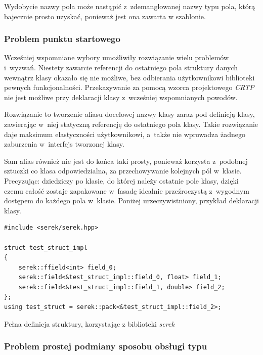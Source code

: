 \documentclass[12pt]{article}
\newcommand{\n}{\newline}
\newcommand{\nonpl}[1]{{\it #1}}
\newcommand{\CRTP}{\nonpl{CRTP} }
\newcommand{\serek}{\nonpl{serek}}
\begin{document}
{{{				Wydobycie nazwy pola może nastąpić z~zdemanglowanej nazwy typu pola, którą bajecznie prosto uzyskać, ponieważ jest ona zawarta
				w szablonie.
			}

			{
				\subsubsection{Problem punktu startowego}

				Wcześniej wspomniane wybory umożliwiły rozwiązanie wielu problemów i~wyzwań. Niestety zawarcie referencji do ostatniego pola
				struktury danych wewnątrz klasy okazało się nie możliwe, bez odbierania użytkownikowi biblioteki pewnych funkcjonalności.
				Przekazywanie za pomocą wzorca projektowego \CRTP nie jest możliwe przy deklaracji klasy z~wcześniej wspomnianych powodów.\n

				Rozwiązanie to tworzenie aliasu docelowej nazwy klasy zaraz pod definicją klasy, zawierając w~niej statyczną referencję do ostatniego pola klasy.
				Takie rozwiązanie daje maksimum elastyczności użytkownikowi, a~także nie wprowadza żadnego zaburzenia w~interfejs tworzonej klasy.\n

				Sam alias również nie jest do końca taki prosty, ponieważ korzysta z~podobnej sztuczki co klasa odpowiedzialna, za przechowywanie
				kolejnych pól w~klasie. Precyzując: dziedziczy po klasie, do której należy ostatnie pole klasy, dzięki czemu całość zostaje
				zapakowane w~fasadę idealnie przeźroczystą z~wygodnym dostępem do każdego pola w~klasie. Poniżej urzeczywistniony, przykład deklaracji klasy.\n

				\begin{captioned}[H]
					\begin{lstlisting}[frame=single]
#include <serek/serek.hpp>

struct test_struct_impl
{
	serek::ffield<int> field_0;
	serek::field<&test_struct_impl::field_0, float> field_1;
	serek::field<&test_struct_impl::field_1, double> field_2;
};
using test_struct = serek::pack<&test_struct_impl::field_2>;
					\end{lstlisting}
					\caption{ Pełna definicja struktury, korzystając z biblioteki \serek}
					\label{serek_full_example}
				\end{captioned}
			}

			{
				\subsubsection{Problem prostej podmiany sposobu obsługi typu}

}}}
\end{document}

